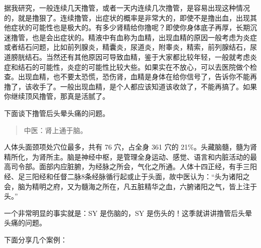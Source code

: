 \documentclass{ctexart}
\begin{document}
据我研究，一般连续几天撸管，或者一天内连续几次撸管，是容易出现这种情况的，就是撸狠了。连续撸管，出症状的概率是非常大的，即使不是撸出血，出现其他症状的可能性也是极大的。有多少肾精给你撸呢？即使你身体底子再厚，长期沉迷撸管，也是会出症状的。精液中有血称为血精，出现血精的原因一般考虑为炎症或者结石问题，比如前列腺炎，精囊炎，尿道炎，附睾炎，精索，前列腺结石，尿道膀胱结石。当然还有其他原因可导致血精，鉴于大家都比较年轻，一般就考虑炎症和结石的可能性，炎症的可能性比较大些。如果实在不放心，可以去医院做个检查。出现血精，也不要太恐慌，恐伤肾，血精是身体在给你信号了，告诉你不能再撸了，该收手了。一般出现血精，是个人都应该知道该收敛了，不能再搞了。如果你继续顶风撸管，那真是活腻了。

下面谈下撸管后头晕头痛的问题。

\begin{quote}
    中医：肾上通于脑。
\end{quote}

人体头面颈项处穴位最多，共有 76 穴，占全身 361 穴的 21\%。头藏脑髓，髓为肾精所化，为肾所主。脑是神经中枢，是管理全身运动、感觉、语言和内脏活动的最高司令部。面部内应脏腑，为经脉之所会，气化之所通。人体十四正经，有手三阳经、足三阳经和任督二脉8条经脉循行起或止于头面，故中医认为：“头为诸阳之会，脑为精明之府，又为髓海之所在，凡五脏精华之血，六腑诸阳之气，皆上注于头。”

一个非常明显的事实就是：SY 是伤脑的，SY 是伤头的！这季就讲讲撸管后头晕头痛的问题。

下面分享几个案例：
\end{document}
